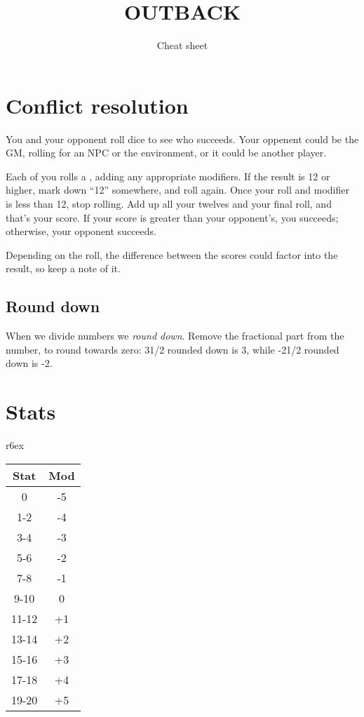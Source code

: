 \documentclass[10pt, a4paper, twocolumn]{article}
\title{\uppercase{Outback}}
\subtitle{Cheat sheet}
\date{}
\begin{document}
\twocolumn[
  \begin{@twocolumnfalse}
    \maketitle
  \end{@twocolumnfalse}
]

\section{Conflict resolution}
You and your opponent roll dice to see who succeeds. Your oppenent could be the
GM, rolling for an NPC or the environment, or it could be another player.

Each of you rolls a , adding any appropriate modifiers. If the result
is 12 or higher, mark down ``12'' somewhere, and roll again. Once your roll and
modifier is less than 12, stop rolling. Add up all your twelves and your final
roll, and that's your score. If your score is greater than your opponent's, you
succeeds; otherwise, your opponent succeeds.

Depending on the roll, the difference between the scores could factor into the
result, so keep a note of it. 

\subsection{Round down}
When we divide numbers we \emph{round down}. Remove the fractional part from the
number, to round towards zero: 3{1/2} rounded down is 3, while -2{1/2} rounded
down is -2. 

\section{Stats}

\begin{wraptable}[9]{r}{6ex}
  \small
\vspace*{-8ex}
\hspace*{-4.5ex}
\begin{tabular}{cc}
  Stat  & Mod \\
  \hline 
  0     & -5       \\
  1-2   & -4       \\
  3-4   & -3       \\
  5-6   & -2       \\
  7-8   & -1       \\
  9-10  &  0       \\
  11-12 & +1       \\
  13-14 & +2       \\
  15-16 & +3       \\
  17-18 & +4       \\
  19-20 & +5
\end{tabular}
\end{wraptable}
\end{document}
